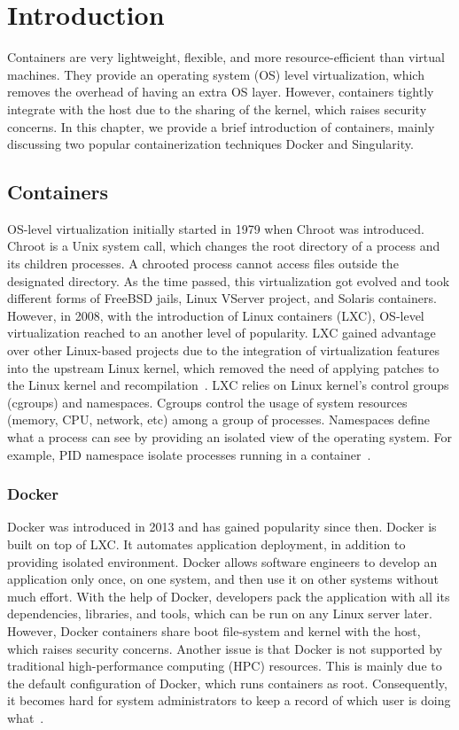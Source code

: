 \chapter{Introduction}
Containers are very lightweight, flexible, and more resource-efficient than
virtual machines. They provide an operating system (OS) level virtualization,
which removes the overhead of having an extra OS layer. However, containers
tightly integrate with the host due to the sharing of the kernel, which raises
security concerns. In this chapter, we provide a brief introduction of containers,
mainly discussing two popular containerization techniques Docker and Singularity.

\section{Containers}
OS-level virtualization initially started in 1979 when Chroot was introduced.
Chroot is a Unix system call, which changes the root directory
of a process and its children processes. A chrooted process cannot access files
outside the designated directory.
As the time passed, this virtualization got evolved and took different forms of
FreeBSD jails, Linux VServer project, and Solaris containers. However, in 2008,
with the introduction of Linux containers (LXC), OS-level virtualization reached
to an another level of popularity. LXC gained advantage over
other Linux-based projects due to the integration of virtualization features into
the upstream Linux kernel, which removed the need of applying patches to the
Linux kernel and recompilation~\cite{reshetova2014security}. 
LXC relies on Linux kernel’s control groups (cgroups)
and namespaces. Cgroups control the usage of system resources (memory, CPU,
network, etc) among a group of processes. Namespaces define what a process
can see by providing an isolated view of the operating system. For example,
PID namespace isolate processes running in a container~\cite{bernstein2014containers}.

\subsection{Docker}
Docker was introduced in 2013 and has gained popularity since then. Docker
is built on top of LXC. It automates application deployment, in addition to
providing isolated environment. Docker allows software engineers to develop an
application only once, on one system, and then use it on other systems without
much effort. With the help of Docker, developers pack the application with
all its dependencies, libraries, and tools, which can be run on any Linux server
later. However, Docker containers share boot file-system and kernel with the host, which
raises security concerns. Another issue is that Docker is not supported by
traditional high-performance computing (HPC) resources. This is mainly due to the
default configuration of Docker, which runs containers as root. Consequently, it
becomes hard for system administrators to keep a record of which user is doing
what~\cite{Containers2017, anderson2015docker}.

